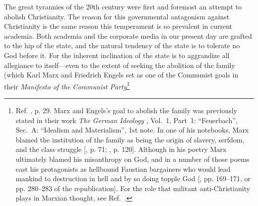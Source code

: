 \documentclass[letterpaper,12pt]{article}
\begin{document}
The great tyrannies of the 20th century were first and foremost an attempt to abolish Christianity. The reason for this governmental antagonism against Christianity is the same reason this temperament is so prevalent in current academia. Both academia and the corporate media in our present day are grafted to the hip of the state, and the natural tendency of the state is to tolerate no God before it. For the inherent inclination of the state is to aggrandize all allegiance to itself---even to the extent of seeking the abolition of the family (which Karl Marx and Friedrich Engels set as one of the Communist goals in their \emph{Manifesto of the Communist Party}\footnote{\label{foot:MarxEngels}Ref. , p. 29. Marx and Engels's goal to abolish the family was previously stated in their work \emph{The German Ideology} \cite{MarxEngels1846}, Vol.~1, Part~1: ``Feuerbach'', Sec.~A: ``Idealism and Materialism'', 1st note. In one of his notebooks, Marx blamed the institution of the family as being the origin of slavery, serfdom, and the class struggle [, p. 71; , p. 120]. Although in his poetry Marx ultimately blamed his misanthropy on God, and in a number of those poems cast his protagonists as hellbound Faustian bargainers who would lead mankind to destruction in hell and by so doing topple God [, pp. 169--171, or pp. 280--283 of the republication]. For the role that militant anti-Christianity plays in Marxian thought, see Ref.~.\par
}
\end{document}

